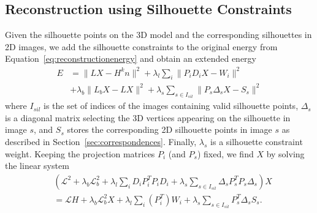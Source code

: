 % 

\subsection{Reconstruction using Silhouette Constraints}

Given the silhouette points on the 3D model and the corresponding silhouettes in 2D images, we add the silhouette constraints to the original energy from Equation~\ref{eq:reconstructionenergy} and obtain an extended energy
%
\begin{equation}
\begin{split}
E&=\|LX - H^{k}n\|^2+ \lambda_{l}\sum_{i}{\|P_{i}D_{i}X-W_{i}\|^2} \\
&+\lambda_{b}\|L_{b}X - LX\|^2+\lambda_{s} \sum_{s\in I_{sil}}{\|P_{s}\Delta_{s}X-S_{s}\|^2}
\end{split}
\end{equation} 
%
where $I_{sil}$ is the set of indices of the images containing valid silhouette points, $\Delta_{s}$ is a diagonal matrix selecting the 3D vertices appearing on the silhouette in image $s$, and $S_s$ stores the corresponding 2D silhouette points in image $s$ as described in Section~\ref{sec:correspondences}. Finally, $\lambda_{s}$ is a silhouette constraint weight.
Keeping the projection matrices $P_i$ (and $P_s$) fixed, we find $X$ by solving the linear system
%
\begin{equation}
\begin{split}
&(\mathcal{L}^2+\lambda_{b}\mathcal{L}_b^2 +\lambda_{l}\sum_{i}{D_{i}P_{i}^{T}P_{i}D_{i}}+\lambda_{s} \sum_{s \in I_{sil}}{\Delta_{s}P_{s}^{T}P_{s}\Delta_{s}})X\\
&=\mathcal{L}H+\lambda_{b}\mathcal{L}_b^2X+\lambda_{l}\sum_{i}{(P_{i}^T)W_{i}}+\lambda_{s}\sum_{s \in I_{sil}}{P_{s}^{T}\Delta_{s}S_{s}}.
\end{split}
\end{equation} 




